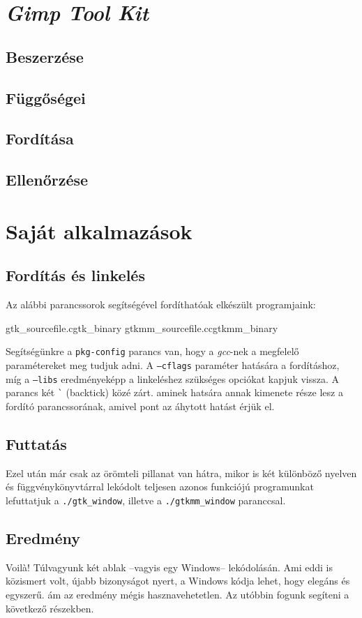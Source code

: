 \section{\textit{Gimp Tool Kit}}

\subsection{Beszerzése}

\subsection{Függőségei}

\subsection{Fordítása}

\subsection{Ellenőrzése}

\section{Saját alkalmazások}

\subsection{Fordítás és linkelés}

Az alábbi parancssorok segítségével fordíthatóak elkészült programjaink:

\lstcompiles
{gtk\_sourcefile.c}{gtk\_binary}
{gtkmm\_sourcefile.cc}{gtkmm\_binary}

Segítségünkre a \texttt{pkg-config} parancs van, hogy a \textit{gcc}-nek a megfelelő paramétereket meg tudjuk adni. A \texttt{--cflags} paraméter hatására a fordításhoz, míg a \texttt{--libs} eredményeképp a linkeléshez szükséges opciókat kapjuk vissza. A parancs két \texttt{\`} (backtick) közé zárt. aminek hatsára annak kimenete része lesz a fordító parancssorának, amivel pont az áhytott hatást érjük el.

\subsection{Futtatás}

Ezel után már csak az örömteli pillanat van hátra, mikor is két különböző nyelven és függvénykönyvtárral lekódolt teljesen azonos funkciójú programunkat lefuttatjuk a \texttt{./gtk\_window}, illetve a \texttt{./gtkmm\_window} paranccsal.

\subsection{Eredmény}

Voil\`{a}! Túlvagyunk két ablak --vagyis egy Windows-- lekódolásán. Ami eddi is közismert volt, újabb bizonyságot nyert, a Windows kódja lehet, hogy elegáns és egyszerű. ám az eredmény mégis hasznavehetetlen. Az utóbbin fogunk segíteni a következő részekben.
